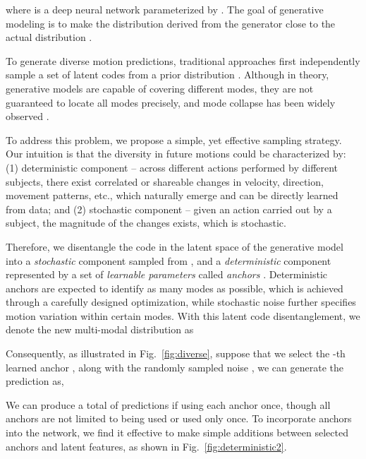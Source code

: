 where  is a deep neural network parameterized by . The goal of generative modeling is to make the distribution  derived from the generator  close to the actual distribution . 

To generate  diverse motion predictions, traditional approaches first independently sample a set of latent codes  from a prior distribution .
Although in theory, generative models are capable of covering different modes, they are not guaranteed to locate all modes precisely, and mode collapse has been widely observed \cite{yuan2020dlow,Yuan2020Diverse}.

To address this problem, we propose a simple, yet effective sampling strategy. Our intuition is that the diversity in future motions could be characterized by: (1) deterministic component -- across different actions performed by different subjects, there exist correlated or shareable changes in velocity, direction, movement patterns, etc., which naturally emerge and can be directly learned from data; and (2) stochastic component -- given an action carried out by a subject, the magnitude of the changes exists, which is stochastic.

Therefore, we disentangle the code in the latent space of the generative model into a {\em{stochastic}} component sampled from , and a {\em{deterministic}} component represented by a set of  {\em{learnable parameters}} called {\em anchors} . Deterministic anchors are expected to identify as many modes as possible, which is achieved through a carefully designed optimization, while stochastic noise further specifies motion variation within certain modes. With this latent code disentanglement, we denote the new multi-modal distribution as


Consequently, as illustrated in Fig.~\ref{fig:diverse}{\color{red}{(b)}}, suppose that we select the -th learned anchor , along with the randomly sampled noise , we can generate the prediction  as,


We can produce a total of  predictions if using each anchor once, though all anchors are not limited to being used or used only once. To incorporate anchors into the network, we find it effective to make simple additions between selected anchors and latent features, as shown in Fig.~\ref{fig:deterministic2}.



